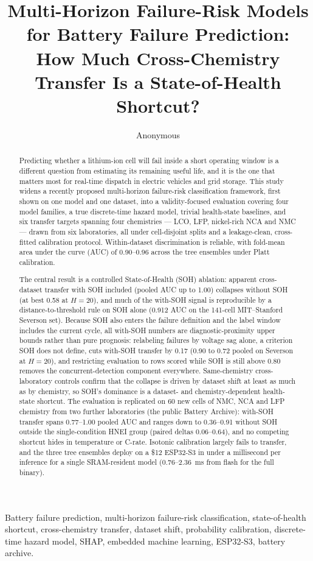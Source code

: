 \documentclass[preprint,12pt]{elsarticle}
\begin{document}
\begin{frontmatter}
\title{Multi-Horizon Failure-Risk Models for Battery Failure Prediction: How Much Cross-Chemistry Transfer Is a State-of-Health Shortcut?}
\author{Anonymous}
\address{Affiliation 1, City, Country (e-mail: author1@example.com)}
\begin{abstract}
Predicting whether a lithium-ion cell will fail inside a short operating window is a different question from estimating its remaining useful life, and it is the one that matters most for real-time dispatch in electric vehicles and grid storage. This study widens a recently proposed multi-horizon failure-risk classification framework, first shown on one model and one dataset, into a validity-focused evaluation covering four model families, a true discrete-time hazard model, trivial health-state baselines, and six transfer targets spanning four chemistries --- LCO, LFP, nickel-rich NCA and NMC --- drawn from six laboratories, all under cell-disjoint splits and a leakage-clean, cross-fitted calibration protocol. Within-dataset discrimination is reliable, with fold-mean area under the curve (AUC) of 0.90--0.96 across the tree ensembles under Platt calibration.

The central result is a controlled State-of-Health (SOH) ablation: apparent cross-dataset transfer with SOH included (pooled AUC up to 1.00) collapses without SOH (at best 0.58 at $H{=}20$), and much of the with-SOH signal is reproducible by a distance-to-threshold rule on SOH alone (0.912 AUC on the 141-cell MIT--Stanford Severson set). Because SOH also enters the failure definition and the label window includes the current cycle, all with-SOH numbers are diagnostic-proximity upper bounds rather than pure prognosis: relabeling failures by voltage sag alone, a criterion SOH does not define, cuts with-SOH transfer by 0.17 (0.90 to 0.72 pooled on Severson at $H{=}20$), and restricting evaluation to rows scored while SOH is still above 0.80 removes the concurrent-detection component everywhere. Same-chemistry cross-laboratory controls confirm that the collapse is driven by dataset shift at least as much as by chemistry, so SOH's dominance is a dataset- and chemistry-dependent health-state shortcut. The evaluation is replicated on 60 new cells of NMC, NCA and LFP chemistry from two further laboratories (the public Battery Archive): with-SOH transfer spans 0.77--1.00 pooled AUC and ranges down to 0.36--0.91 without SOH outside the single-condition HNEI group (paired deltas 0.06--0.64), and no competing shortcut hides in temperature or C-rate. Isotonic calibration largely fails to transfer, and the three tree ensembles deploy on a \$12 ESP32-S3 in under a millisecond per inference for a single SRAM-resident model (0.76--2.36~ms from flash for the full binary).
\end{abstract}
\begin{keyword}
Battery failure prediction, multi-horizon failure-risk classification, state-of-health shortcut, cross-chemistry transfer, dataset shift, probability calibration, discrete-time hazard model, SHAP, embedded machine learning, ESP32-S3, battery archive.
\end{keyword}
\end{frontmatter}
\end{document}
